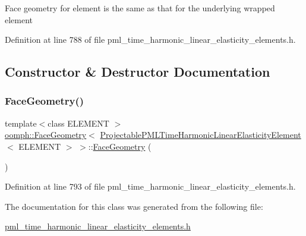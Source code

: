 Face geometry for element is the same as that for the underlying wrapped element 

Definition at line 788 of file pml\+\_\+time\+\_\+harmonic\+\_\+linear\+\_\+elasticity\+\_\+elements.\+h.



\subsection{Constructor \& Destructor Documentation}
\mbox{\label{classoomph_1_1FaceGeometry_3_01ProjectablePMLTimeHarmonicLinearElasticityElement_3_01ELEMENT_01_4_01_4_a82ef9329a09966cbfdd2271ea9a9b282}} 
\subsubsection{\texorpdfstring{Face\+Geometry()}{FaceGeometry()}}
{\footnotesize\ttfamily template$<$class E\+L\+E\+M\+E\+NT $>$ \\
\hyperlink{classoomph_1_1FaceGeometry}{oomph\+::\+Face\+Geometry}$<$ \hyperlink{classoomph_1_1ProjectablePMLTimeHarmonicLinearElasticityElement}{Projectable\+P\+M\+L\+Time\+Harmonic\+Linear\+Elasticity\+Element}$<$ E\+L\+E\+M\+E\+NT $>$ $>$\+::\hyperlink{classoomph_1_1FaceGeometry}{Face\+Geometry} (\begin{DoxyParamCaption}{ }\end{DoxyParamCaption})\hspace{0.3cm}{\ttfamily [inline]}}



Definition at line 793 of file pml\+\_\+time\+\_\+harmonic\+\_\+linear\+\_\+elasticity\+\_\+elements.\+h.



The documentation for this class was generated from the following file\+:\begin{DoxyCompactItemize}
\item 
\hyperlink{pml__time__harmonic__linear__elasticity__elements_8h}{pml\+\_\+time\+\_\+harmonic\+\_\+linear\+\_\+elasticity\+\_\+elements.\+h}\end{DoxyCompactItemize}
